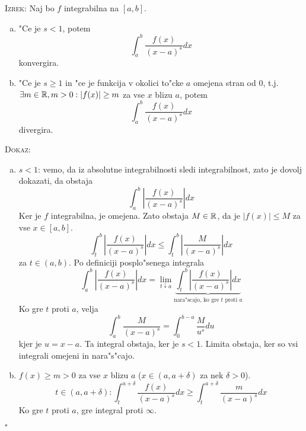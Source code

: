\textsc{Izrek:} Naj bo $f$ integrabilna na $[a, b]$.
\begin{enumerate}[(a)]
	\item "Ce je $s < 1$, potem
	\begin{equation*}
	\int_a^b \dfrac{f(x)}{(x-a)^s} dx
	\end{equation*}
	konvergira.
	
	\item "Ce je $s \geq 1$ in "ce je funkcija v okolici to"cke $a$ omejena stran od 0, t.j. $\exists m \in \mathbb{R}, m > 0: |f(x)| \geq m$ za vse $x$ blizu $a$, potem
	\begin{equation*}
	\int_a^b \dfrac{f(x)}{(x-a)^s} dx
	\end{equation*}
	divergira.
\end{enumerate}
\textsc{Dokaz:}
\begin{enumerate}[(a)]
	\item $s < 1$: vemo, da iz absolutne integrabilnosti sledi integrabilnost, zato je dovolj dokazati, da obstaja 
	\begin{equation*}
	\int_a^b \left| \dfrac{f(x)}{(x-a)^s} \right| dx
	\end{equation*}
	Ker je $f$ integrabilna, je omejena. Zato obstaja $M \in \mathbb{R}$, da je $|f(x)| \leq M$ za vse $x \in [a, b]$.
	\begin{equation*}
	\int_t^b \left| \dfrac{f(x)}{(x - a)^s} \right| dx \leq \int_t^b \left| \dfrac{M}{(x-a)^s} \right| dx
 	\end{equation*}
 	za $t \in (a, b)$. Po definiciji posplo"senega integrala
 	\begin{equation*}
 	\int_a^b \left| \dfrac{f(x)}{(x-a)^s} \right| dx = \lim_{t \downarrow a} \underbrace{\int_t^b \left| \dfrac{f(x)}{(x-a)^s} \right| dx}_\text{nara"scajo, ko gre $t$ proti $a$}
 	\end{equation*}
 	Ko gre $t$ proti $a$, velja
 	\begin{equation*}
 	\int_a^b \dfrac{M}{(x-a)^s} = \int_0^{b-a} \dfrac{M}{u^s} du
 	\end{equation*}
 	kjer je $u = x-a$. Ta integral obstaja, ker je $s < 1$. Limita obstaja, ker so vsi integrali omejeni in nara"s"cajo.
 	
 	\item $f(x) \geq m > 0$ za vse $x$ blizu $a$ ($x \in (a, a+\delta)$ za nek $\delta > 0$).
 	\begin{equation*}
 	t \in (a, a+\delta): \int_t^{a + \delta} \dfrac{f(x)}{(x-a)^s} dx \geq \int_t^{a + \delta} \dfrac{m}{(x-a)^s} dx
 	\end{equation*}
 	Ko gre $t$ proti $a$, gre integral proti $\infty$.
\end{enumerate}
\hfill $\square$

